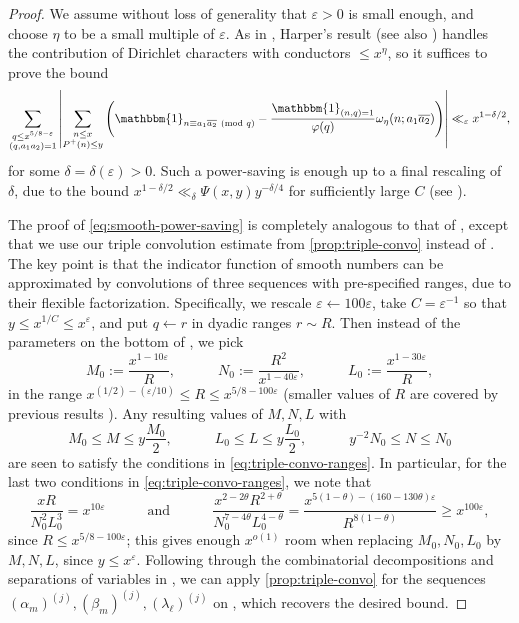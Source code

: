 \documentclass[reqno,11pt]{amsart}
\theoremstyle{remark}
\numberwithin{equation}{section}
\newcommand{\one}{\mathbbm{1}}
\newcommand{\eps}{\varepsilon}
\renewcommand{\bar}{\overline}
\renewcommand{\pmod}[1]{\ (\textnormal{mod } #1)}
\begin{document}
\begin{proof}
We assume without loss of generality that $\eps > 0$ is small enough, and choose $\eta$ to be a small multiple of $\eps$.
As in \cite[p.\,855--856]{drappeau2015theoremes}, Harper's result \cite[Lemme 5]{drappeau2015theoremes} (see also \cite{harper2012bombieri}) handles the contribution of Dirichlet characters with conductors $\le x^\eta$, so it suffices to prove the bound
\begin{equation} \label{eq:smooth-power-saving}
    \sum_{\substack{q \le x^{5/8-\eps} \\ (q, a_1 a_2) = 1}}
    \left\vert 
    \sum_{\substack{n \le x \\ P^+(n) \le y}} \left(\one_{n \equiv a_1 \bar{a_2} \pmod{q}} - 
    \frac{\one_{(n, q) = 1}}{\varphi(q)} \omega_\eta(n; a_1\bar{a_2})\right) \right\vert 
    \ll_\eps x^{1-\delta/2},
\end{equation}
for some $\delta = \delta(\eps) > 0$. Such a power-saving is enough up to a final rescaling of $\delta$, due to the bound $x^{1-\delta/2} \ll_\delta \Psi(x, y) y^{-\delta/4}$ for sufficiently large $C$ (see \cite[p.\,856]{drappeau2015theoremes}).

The proof of \cref{eq:smooth-power-saving} is completely analogous to that of \cite[Proposition 2]{drappeau2015theoremes}, except that we use our triple convolution estimate from \cref{prop:triple-convo} instead of \cite[Th\'eor\`eme 3]{drappeau2015theoremes}. 
The key point is that the indicator function of smooth numbers can be approximated by convolutions of three sequences with pre-specified ranges, due to their flexible factorization. Specifically, we rescale $\eps \gets 100\eps$, take $C = \eps^{-1}$ so that $y \le x^{1/C} \le x^\eps$, and put $q \gets r$ in dyadic ranges $r \sim R$. Then instead of the parameters on the bottom of \cite[p.\,852]{drappeau2015theoremes}, we pick
\[
    M_0 := \frac{x^{1-10\eps}}{R},
    \qquad\quad 
    N_0 := \frac{R^2}{x^{1-40\eps}},
    \qquad\quad 
    L_0 := \frac{x^{1-30\eps}}{R},
\]
in the range $x^{(1/2) - (\eps/10)} \le R \le x^{5/8-100\eps}$ (smaller values of $R$ are covered by previous results \cite{drappeau2015theoremes}). Any resulting values of $M, N, L$ with
\[
    M_0 \le M \le y \frac{M_0}{2},
    \qquad\quad 
    L_0 \le L \le y \frac{L_0}{2},
    \qquad\quad 
    y^{-2} N_0 \le N \le N_0
\]
are seen to satisfy the conditions in \cref{eq:triple-convo-ranges}. In particular, for the last two conditions in \cref{eq:triple-convo-ranges}, we note that 
\[
    \frac{x R}{N_0^2 L_0^3}
    =
    x^{10\eps}
    \qquad\quad 
    \text{and}
    \qquad\quad
    \frac{x^{2-2\theta} R^{2+\theta}}{N_0^{7-4\theta} L_0^{4-\theta}}
    =
    \frac{x^{5(1-\theta)-(160-130\theta)\eps}}{R^{8(1-\theta)}}
    \ge
    x^{100\eps},
\]
since $R \le x^{5/8-100\eps}$; this gives enough $x^{o(1)}$ room when replacing $M_0, N_0, L_0$ by $M, N, L$, since $y \le x^\eps$. Following through the combinatorial decompositions and separations of variables in \cite[p.\,852--854]{drappeau2015theoremes}, we can apply \cref{prop:triple-convo} for the sequences $(\alpha_m)^{(j)}, (\beta_m)^{(j)}, (\lambda_\ell)^{(j)}$ on \cite[p.\,854]{drappeau2015theoremes}, which recovers the desired bound.
\end{proof}
\end{document}
